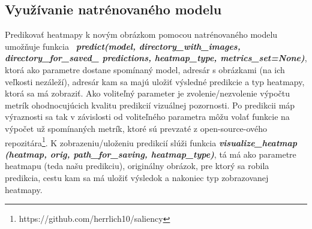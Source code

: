 \subsection{Využívanie natrénovaného modelu}
Predikovať heatmapy k novým obrázkom pomocou natrénovaného modelu umožňuje funkcia \ \textit{\textbf{predict(model, directory\_with\_images, directory\_for\_saved\_ predictions, heatmap\_type, metrics\_set=None)}}, ktorá ako parametre dostane spomínaný model, adresár s obrázkami (na ich veľkosti nezáleží), adresár kam sa majú uložiť výsledné predikcie a typ heatmapy, ktorá sa má zobraziť. Ako voliteľný parameter je zvolenie/nezvolenie výpočtu metrík ohodnocujúcich kvalitu predikcií vizuálnej pozornosti. Po predikcii máp výraznosti sa tak v závislosti od voliteľného parametra môžu volať funkcie na výpočet už spomínaných metrík, ktoré sú prevzaté z open-source-ového repozitára\footnote{https://github.com/herrlich10/saliency}. K zobrazeniu/uloženiu predikcií slúži funkcia \textit{\textbf{visualize\_heatmap (heatmap, orig, path\_for\_saving, heatmap\_type)}}, tá má ako parametre heatmapu (teda našu predikciu), originálny obrázok, pre ktorý sa robila predikcia, cestu kam sa má uložiť výsledok a nakoniec typ zobrazovanej heatmapy. 
